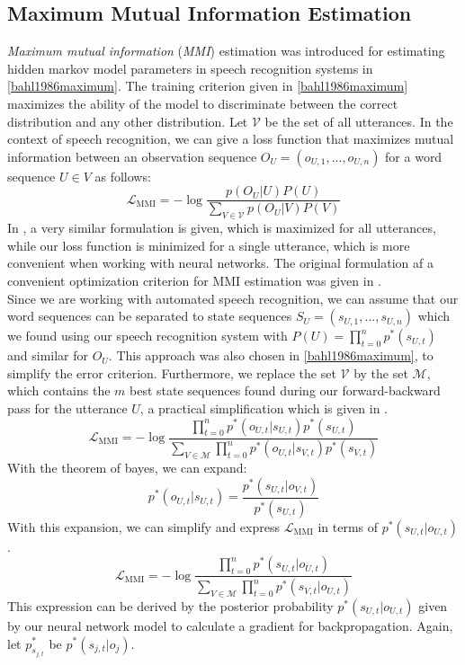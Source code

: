 \subsection{Maximum Mutual Information Estimation}
\textit{Maximum mutual information} (\textit{MMI}) estimation was introduced for estimating hidden markov model parameters in speech recognition systems in \ref{bahl1986maximum}. The training criterion given in \ref{bahl1986maximum} maximizes the ability of the model to discriminate between the correct distribution and any other distribution. Let $\mathcal{V}$ be the set of all utterances. In the context of speech recognition, we can give a loss function that maximizes mutual information between an observation sequence $O_U = (o_{U,1}, ..., o_{U,n})$ for a word sequence $U \in V$ as follows:
\[
\mathcal{L}_{\text{MMI}} = -\log\frac{p(O_U|U)P(U)}{\sum_{V \in \mathcal{V}} p(O_U|V)P(V)} 
\]
In \cite{ghoshal2013sequence}, a very similar formulation is given, which is maximized for all utterances, while our loss function is minimized for a single utterance, which is more convenient when working with neural networks. The original formulation af a convenient optimization criterion for MMI estimation was given in \cite{schluter1998comparison}.\\
Since we are working with automated speech recognition, we can assume that our word sequences can be separated to state sequences $S_U = (s_{U,1},...,s_{U,n})$ which we found using our speech recognition system with $P(U) = \prod_{t = 0}^{n} p^*(s_{U,t})$ and similar for $O_U$. This approach was also chosen in \ref{bahl1986maximum}, to simplify the error criterion. Furthermore, we replace the set $\mathcal{V}$ by the set $\mathcal{M}$, which contains the $m$ best state sequences found during our forward-backward pass for the utterance $U$, a practical simplification which is given in \cite{schluter1998comparison}.
\[
\mathcal{L}_{\text{MMI}} = -\log\frac{\prod_{t = 0}^{n} p^*(o_{U,t}|s_{U,t})p^*(s_{U,t})}{\sum_{V \in \mathcal{M}} \prod_{t = 0}^{n} p^*(o_{U,t}|s_{V,t})p^*(s_{V,t})} 
\]
With the theorem of bayes, we can expand:
\[
p^*(o_{U,t}|s_{U,t}) = \frac{p^*(s_{U,t}|o_{V,t})}{p^*(s_{U,t})}
\]
With this expansion, we can simplify and express $\mathcal{L}_{\text{MMI}}$ in terms of $p^*(s_{U,t}|o_{U,t})$.
\[
\mathcal{L}_{\text{MMI}} = -\log\frac{\prod_{t = 0}^{n} p^*(s_{U,t}|o_{U,t})}{\sum_{V \in \mathcal{M}} \prod_{t = 0}^{n} p^*(s_{V,t}|o_{U,t})} 
\]
This expression can be derived by the posterior probability $p^*(s_{U,t}|o_{U,t})$ given by our neural network model to calculate a gradient for backpropagation. Again, let $p^*_{s_{j,t}}$ be $p^*(s_{j,t}|o_j)$.
